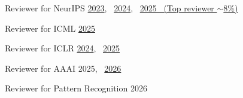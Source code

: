 \documentclass[11pt, a4paper]{cv}
\begin{document}
\clearpage

\begin{cvservices}

  \cvservice
    {Reviewer for} %
    {NeurIPS} %
    { %
      \href{https://neurips.cc/Conferences/2023/ProgramCommittee\#:~:text=EungGu\%20Yun}{2023}, \,
      \href{https://neurips.cc/Conferences/2024/ProgramCommittee\#:~:text=EungGu\%20Yun}{2024}, \,
      \href{https://neurips.cc/Conferences/2025/ProgramCommittee\#:~:text=EungGu\%20Yun}{2025 \ (Top reviewer $\sim$8\%)}
    }

  \cvservice
    {Reviewer for} %
    {ICML} %
    { %
      \href{https://icml.cc/Conferences/2025/ProgramCommittee\#:~:text=EungGu\%20Yun}{2025}
    }

  \cvservice
    {Reviewer for} %
    {ICLR} %
    { %
      \href{https://iclr.cc/Conferences/2024/Reviewers\#:~:text=EungGu\%20Yun}{2024}, \,
      \href{https://iclr.cc/Conferences/2025/ProgramCommittee\#:~:text=EungGu\%20Yun}{2025}
    }

  \cvservice
    {Reviewer for} %
    {AAAI} %
    { %
      2025, \,
      \href{https://aaai.org/conference/aaai/aaai-26/2026-program-committee\#:~:text=EungGu\%20Yun}{2026}
    }

  \cvservice
    {Reviewer for} %
    {Pattern Recognition} %
    {2026} %

\end{cvservices}
\end{document}
